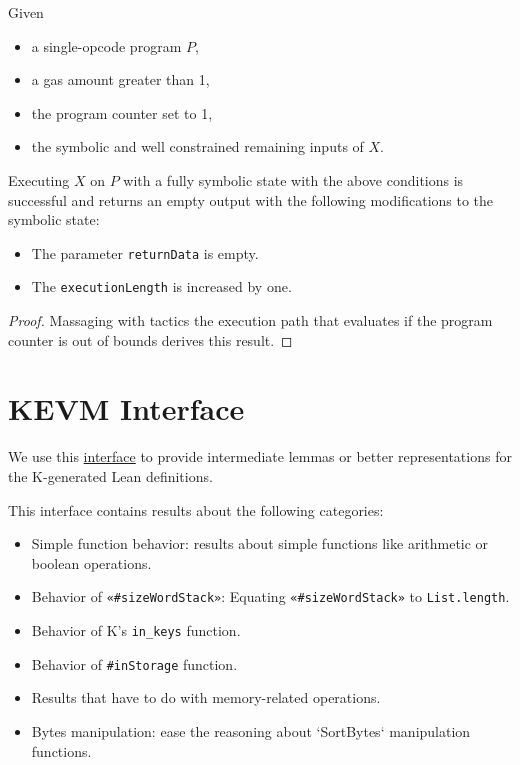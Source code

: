 \begin{theorem}[X_bad_pc]\label{thm:X_bad_pc}\leanok
Given
\begin{itemize}
\item a single-opcode program $P$,
\item a gas amount greater than 1,
\item the program counter set to 1,
\item the symbolic and well constrained remaining inputs of $X$.
\end{itemize}
Executing $X$ on $P$ with a fully symbolic state with the above conditions
is successful and returns an empty output with the following modifications to
the symbolic state:
\begin{itemize}
\item The parameter \texttt{returnData} is empty.
\item The \texttt{executionLength} is increased by one.
\end{itemize}
\end{theorem}
\begin{proof}
\leanok
Massaging with tactics the execution path that evaluates if the program counter
is out of bounds derives this result.
\end{proof}

\section{KEVM Interface}

We use this
\href{https://runtimeverification.github.io/evm-equivalence/docs/EvmEquivalence/Interfaces/FuncInterface.html}{interface}
to provide intermediate lemmas or better representations for the K-generated
Lean definitions.

This interface contains results about the following categories:
\begin{itemize}
\item Simple function behavior: results about simple functions like arithmetic
  or boolean operations.
\item Behavior of \texttt{«#sizeWordStack»}: Equating \texttt{«#sizeWordStack»}
  to \texttt{List.length}.
\item Behavior of K's \texttt{in_keys} function.
\item Behavior of \texttt{#inStorage} function.
\item Results that have to do with memory-related operations.
\item Bytes manipulation: ease the reasoning about `SortBytes` manipulation functions.
\end{itemize}

